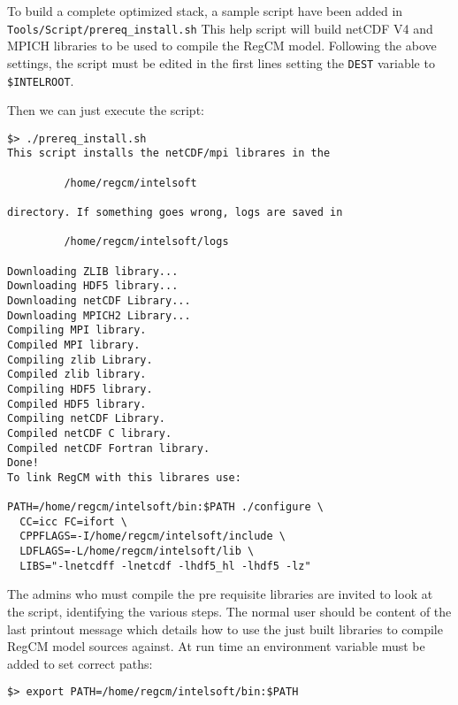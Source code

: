 To build a complete optimized stack, a sample script have been added
in \verb=Tools/Script/prereq_install.sh=
This help script will build netCDF V4 and MPICH libraries to be used to
compile the RegCM model.
Following the above settings, the script must be edited in the first lines
setting the \verb=DEST= variable to \verb=$INTELROOT=.

Then we can just execute the script:

\begin{Verbatim}
$> ./prereq_install.sh
This script installs the netCDF/mpi librares in the

         /home/regcm/intelsoft

directory. If something goes wrong, logs are saved in

         /home/regcm/intelsoft/logs

Downloading ZLIB library...
Downloading HDF5 library...
Downloading netCDF Library...
Downloading MPICH2 Library...
Compiling MPI library.
Compiled MPI library.
Compiling zlib Library.
Compiled zlib library.
Compiling HDF5 library.
Compiled HDF5 library.
Compiling netCDF Library.
Compiled netCDF C library.
Compiled netCDF Fortran library.
Done!
To link RegCM with this librares use:

PATH=/home/regcm/intelsoft/bin:$PATH ./configure \
  CC=icc FC=ifort \
  CPPFLAGS=-I/home/regcm/intelsoft/include \
  LDFLAGS=-L/home/regcm/intelsoft/lib \
  LIBS="-lnetcdff -lnetcdf -lhdf5_hl -lhdf5 -lz"

\end{Verbatim}

The admins who must compile the pre requisite libraries are invited to look
at the script, identifying the various steps.
The normal user should be content of the last printout message which details
how to use the just built libraries to compile RegCM model sources against.
At run time an environment variable must be added to set correct paths:

\begin{Verbatim}
$> export PATH=/home/regcm/intelsoft/bin:$PATH
\end{Verbatim}
